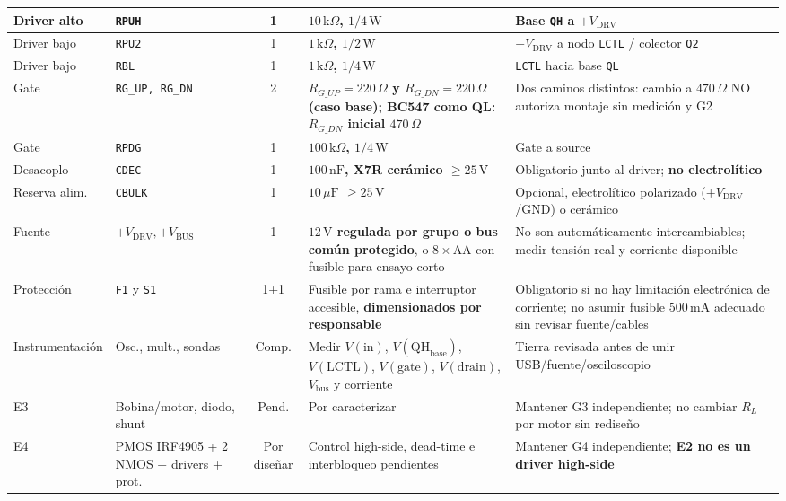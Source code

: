 \documentclass[10pt, a4paper, landscape]{article}
\begin{document}
{\begin{tabularx}{\linewidth}{|>{\raggedright\arraybackslash}p{2.3cm}|>{\raggedright\arraybackslash}p{2.3cm}|c|>{\raggedright\arraybackslash}p{7.8cm}|>{\raggedright\arraybackslash}X|}
Driver alto & \texttt{RPUH} & 1 & \textbf{$10\,\text{k}\Omega$, $1/4\,\text{W}$} & Base \texttt{QH} a $+V_{\text{DRV}}$ \\ \hline
Driver bajo & \texttt{RPU2} & 1 & \textbf{$1\,\text{k}\Omega$, $1/2\,\text{W}$} & $+V_{\text{DRV}}$ a nodo \texttt{LCTL} / colector \texttt{Q2} \\ \hline
Driver bajo & \texttt{RBL} & 1 & \textbf{$1\,\text{k}\Omega$, $1/4\,\text{W}$} & \texttt{LCTL} hacia base \texttt{QL} \\ \hline
Gate & \texttt{RG\_UP, RG\_DN} & 2 & \textbf{$R_{G\_UP}=220\,\Omega$ y $R_{G\_DN}=220\,\Omega$ (caso base); BC547 como QL: $R_{G\_DN}$ inicial $470\,\Omega$} & Dos caminos distintos: cambio a $470\,\Omega$ NO autoriza montaje sin medición y G2 \\ \hline
Gate & \texttt{RPDG} & 1 & \textbf{$100\,\text{k}\Omega$, $1/4\,\text{W}$} & Gate a source \\ \hline
Desacoplo & \texttt{CDEC} & 1 & \textbf{$100\,\text{nF}$, X7R cerámico $\ge 25\,\text{V}$} & Obligatorio junto al driver; \textbf{no electrolítico} \\ \hline
Reserva alim. & \texttt{CBULK} & 1 & \textbf{$10\,\mu\text{F}$ $\ge 25\,\text{V}$} & Opcional, electrolítico polarizado ($+V_{\text{DRV}}$/GND) o cerámico \\ \hline
Fuente & $+V_{\text{DRV}}, +V_{\text{BUS}}$ & 1 & \textbf{$12\,\text{V}$ regulada por grupo o bus común protegido}, o $8\times\text{AA}$ con fusible para ensayo corto & No son automáticamente intercambiables; medir tensión real y corriente disponible \\ \hline
Protección & \texttt{F1} y \texttt{S1} & 1+1 & Fusible por rama e interruptor accesible, \textbf{dimensionados por responsable} & Obligatorio si no hay limitación electrónica de corriente; no asumir fusible $500\,\text{mA}$ adecuado sin revisar fuente/cables \\ \hline
Instrumentación & Osc., mult., sondas & Comp. & Medir $V(\text{in})$, $V(\text{QH}_{\text{base}})$, $V(\text{LCTL})$, $V(\text{gate})$, $V(\text{drain})$, $V_{\text{bus}}$ y corriente & Tierra revisada antes de unir USB/fuente/osciloscopio \\ \hline
E3 & Bobina/motor, diodo, shunt & Pend. & Por caracterizar & Mantener G3 independiente; no cambiar $R_L$ por motor sin rediseño \\ \hline
E4 & 2 PMOS IRF4905 + 2 NMOS + drivers + prot. & Por diseñar & Control high-side, dead-time e interbloqueo pendientes & Mantener G4 independiente; \textbf{E2 no es un driver high-side} \\ \hline
\end{tabularx}
}
\end{document}
